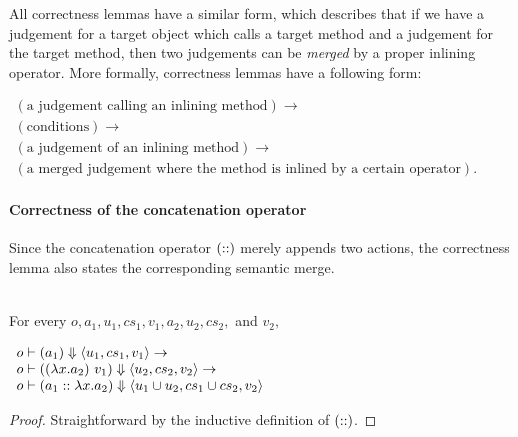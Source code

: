 All correctness lemmas have a similar form, which describes that if we
have a judgement for a target object which calls a target method and a
judgement for the target method, then two judgements can be
\emph{merged} by a proper inlining operator. More formally,
correctness lemmas have a following form:
\begin{center}
  \begin{math}
    \begin{array}{l}
      (\textrm{a judgement calling an inlining method}) \to \\
      (\textrm{conditions}) \to \\
      (\textrm{a judgement of an inlining method}) \to \\
      (\textrm{a merged judgement where the method is inlined by a certain operator}).
    \end{array}
  \end{math}
\end{center}

\paragraph{Correctness of the concatenation operator}

Since the concatenation operator $(::)$ merely appends two
actions, the correctness lemma also states the corresponding semantic
merge.

\begin{lemma}
  \label{lem-concatsymb}
  \mbox{}\\
  For every $o, a_1, u_1, cs_1, v_1, a_2, u_2, cs_2,$ and $v_2,$
  \begin{center}
    \begin{math}
      \begin{array}{l}
        o |- (a_1) \Downarrow \langle u_1, cs_1, v_1 \rangle \to \\
        o |- ((\lambda x.a_2)\ v_1) \Downarrow \langle u_2, cs_2, v_2 \rangle \to \\
        o |- (a_1 ::{} \lambda x.a_2) \Downarrow \langle u_1 \cup u_2, cs_1 \cup cs_2, v_2 \rangle
      \end{array}
    \end{math}
  \end{center}
\end{lemma}
\begin{proof}
  Straightforward by the inductive definition of $(::)$.
\end{proof}

